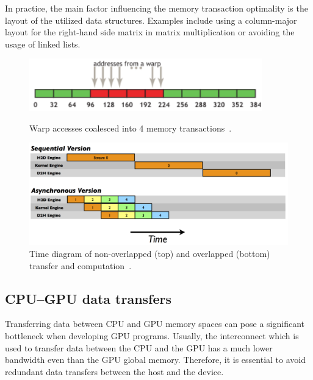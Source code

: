 In practice, the main factor influencing the memory transaction optimality is the layout of the utilized data structures. Examples include using a column-major layout for the right-hand side matrix in matrix multiplication or avoiding the usage of linked lists.

\begin{figure}[b]
	\centering
	\begin{minipage}{.5\textwidth}
        \centering
        \includegraphics[width=0.9\textwidth]{img/coal1}
        \caption{Warp accesses coalesced into 4 memory transactions~\cite{site:cuda}.}
        \label{fig:coal}
	\end{minipage}%
	\begin{minipage}{.5\textwidth}
        \centering
        \includegraphics[width=\textwidth]{img/C2050Timeline-1024x670.png}
        \caption{Time diagram of non-overlapped (top) and overlapped (bottom) transfer and computation~\cite{site:stream}.}
        \label{fig:transfer}
	\end{minipage}
\end{figure}

\subsection{CPU--GPU data transfers}
\label{sec:transfers}

Transferring data between CPU and GPU memory spaces can pose a significant bottleneck when developing GPU programs. Usually, the interconnect which is used to transfer data between the CPU and the GPU has a much lower bandwidth even than the GPU global memory. Therefore, it is essential to avoid redundant data transfers between the host and the device.

